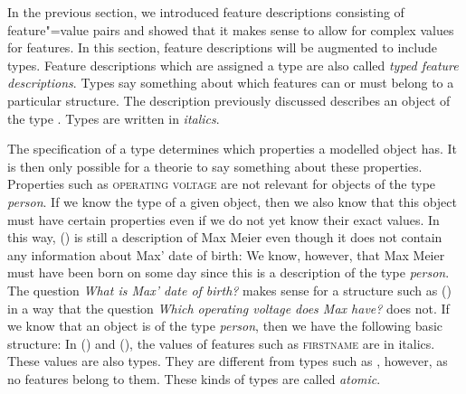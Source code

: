 In the previous section, we introduced feature descriptions consisting of feature"=value pairs and showed that it makes sense to allow for
complex values for features. In this section, feature descriptions will be augmented to include types. Feature descriptions which are assigned a type
are also called \emph{typed feature descriptions}. Types say something about which features can or must belong to a 
particular structure. The description previously discussed describes an object of the type .
\ea
{}
\z
Types are written in \textit{italics}. 

The specification of a type determines which properties a modelled object has. It is then only
possible for a theorie to say something about these properties.
Properties such as \textsc{operating voltage} are not relevant for objects of the type \textit{person}. If we know the type of a given object, then we
also know that this object must have certain properties even if we do not yet know their exact values. In this way, () is still a description of
Max Meier even though it does not contain any information about Max' date of birth:
\ea
{}
\z
We know, however, that Max Meier must have been born on some day since this is a description of the type \textit{person}.
The question \emph{What is Max' date of birth?} makes sense for a structure such as () in a way that the question
\emph{Which operating voltage does Max have?} does not. If we know that an object is of the type \textit{person}, then we have
the following basic structure:
\ea
{}
\z
In () and (), the values of features such as \textsc{firstname} are in italics. These values are also types. They are different from
types such as , however, as no features belong to them. These kinds of types are called \emph{atomic}.

